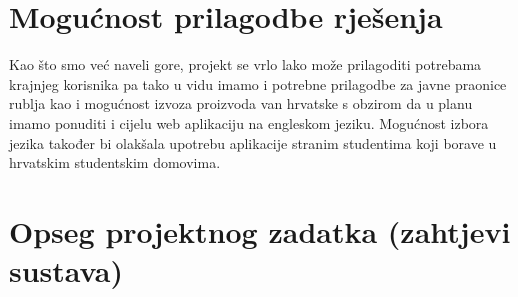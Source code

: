 		\section{Mogućnost prilagodbe rješenja}
			
			{Kao što smo već naveli gore, projekt se vrlo lako može prilagoditi potrebama krajnjeg korisnika pa tako u
			vidu imamo i potrebne prilagodbe za javne praonice rublja kao i mogućnost izvoza proizvoda van hrvatske
			s obzirom da u planu imamo ponuditi i cijelu web aplikaciju na engleskom jeziku. Mogućnost izbora
			jezika također bi olakšala upotrebu aplikacije stranim studentima koji borave u hrvatskim studentskim
			domovima.}
			
		\section{Opseg projektnog zadatka (zahtjevi sustava)}
		
